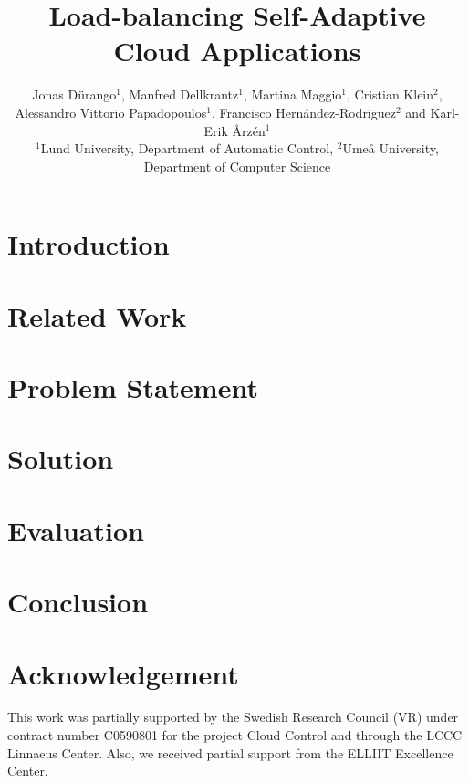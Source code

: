 \documentclass[letterpaper, 10 pt, conference]{ieeeconf}
\title{\LARGE \bf Load-balancing Self-Adaptive Cloud Applications}
\author{Jonas D{\"u}rango{$^1$}, Manfred Dellkrantz{$^1$}, Martina Maggio{$^1$}, Cristian Klein{$^2$}, \\
Alessandro Vittorio Papadopoulos{$^1$}, Francisco Hern{\'a}ndez-Rodriguez{$^2$} and Karl-Erik {\AA}rz\'en{$^1$}\\
{\small {$^1$}Lund University, Department of Automatic Control, {$^2$}Ume{\aa} University, Department of Computer Science}}
\begin{document}
\maketitle
\thispagestyle{empty}
\pagestyle{empty}

\begin{abstract}

\end{abstract}

\section{Introduction}
\label{sec:introduction}


\section{Related Work}
\label{sec:related}


\section{Problem Statement}
\label{sec:problem}


\section{Solution}
\label{sec:solution}


\section{Evaluation}
\label{sec:evaluation}


\section{Conclusion}
\label{sec:conclusion}


\section*{Acknowledgement}
  This work was partially supported by the Swedish Research Council
  (VR) under contract number C0590801 for the project Cloud Control
  and through the LCCC Linnaeus Center. Also, we received partial
  support from the ELLIIT Excellence Center.

\printbibliography
\end{document}
